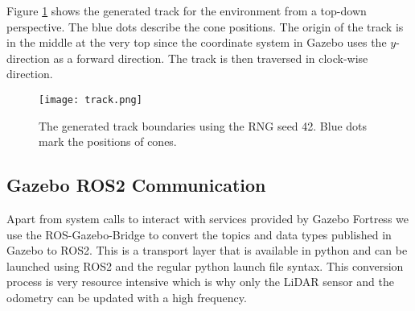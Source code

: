 Figure \ref{fig:track} shows the generated track for the environment from a top-down perspective. The blue dots describe the cone positions. The origin of the track is in the middle at the very top since the coordinate system in Gazebo uses the $y$-direction as a forward direction. The track is then traversed in clock-wise direction.

\begin{figure}[ht]
\vskip 0.2in
\begin{center}
\centerline{\texttt{[image: track.png]}}
\caption{The generated track boundaries using the RNG seed 42. Blue dots mark the positions of cones.}
\label{fig:track}
\end{center}
\vskip -0.2in
\end{figure}

\subsection{Gazebo ROS2 Communication}

Apart from system calls to interact with services provided by Gazebo Fortress we use the ROS-Gazebo-Bridge to convert the topics and data types published in Gazebo to ROS2. 
This is a transport layer that is available in python and can be launched using ROS2 and the regular python launch file syntax. 
This conversion process is very resource intensive which is why only the LiDAR sensor and the odometry can be updated with a high frequency.


